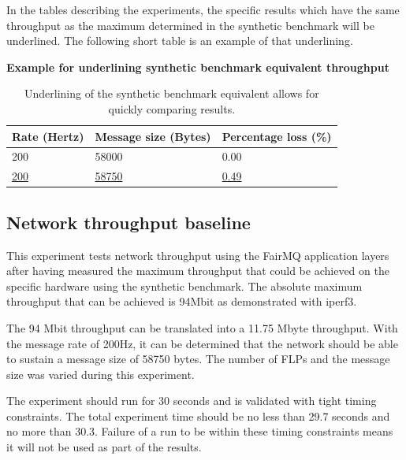 \documentclass[]{article}
\begin{document}
In the tables describing the experiments, the specific results which have the same throughput as the maximum determined in the synthetic benchmark will be underlined. The following short table is an example of that underlining.

\begin{table}[H]
	\textbf{Example for underlining synthetic benchmark equivalent throughput}
	\begin{center}
		\begin{tabular}{ | l | l | l | }
			\hline
			\textbf{Rate (Hertz)} & \textbf{Message size (Bytes)} & \textbf{Percentage loss (\%)} \\ \hline
			
			200 & 58000 & 0.00 \\ \hline
			\underline{200} & \underline{58750} & \underline{0.49} \\ \hline
		\end{tabular}
		\caption{Underlining of the synthetic benchmark equivalent allows for quickly comparing results.}
		\label{tab:benchmark}
	\end{center}
\end{table}

\subsection{Network throughput baseline}
This experiment tests network throughput using the FairMQ application layers after having measured the maximum throughput that could be achieved on the specific hardware using the synthetic benchmark. The absolute maximum throughput that can be achieved is 94Mbit as demonstrated with iperf3.

The 94 Mbit throughput can be translated into a 11.75 Mbyte throughput. With the message rate of 200Hz, it can be determined that the network should be able to sustain a message size of 58750 bytes. The number of FLPs and the message size was varied during this experiment.

The experiment should run for 30 seconds and is validated with tight timing constraints. The total experiment time should be no less than 29.7 seconds and no more than 30.3. Failure of a run to be within these timing constraints means it will not be used as part of the results.
\end{document}
